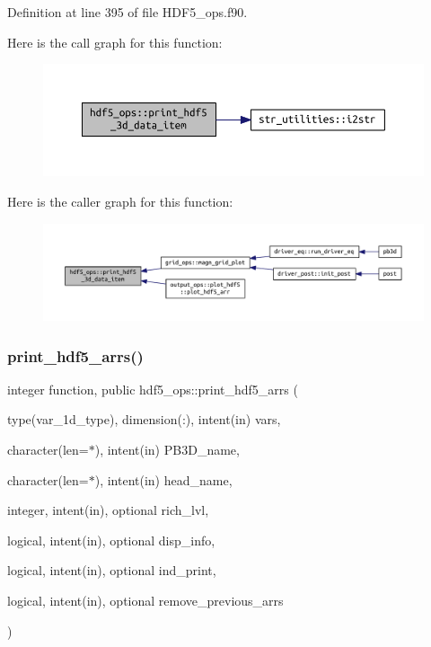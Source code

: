 Definition at line 395 of file H\+D\+F5\+\_\+ops.\+f90.

Here is the call graph for this function\+:\nopagebreak
\begin{figure}[H]
\begin{center}
\leavevmode
\includegraphics[width=350pt]{namespacehdf5__ops_ad794d069ca355f28536fba7e0d21bc13_cgraph}
\end{center}
\end{figure}
Here is the caller graph for this function\+:\nopagebreak
\begin{figure}[H]
\begin{center}
\leavevmode
\includegraphics[width=350pt]{namespacehdf5__ops_ad794d069ca355f28536fba7e0d21bc13_icgraph}
\end{center}
\end{figure}
\mbox{\label{namespacehdf5__ops_af80b879ed614698ed91b8235cf1cb22a}} 
\subsubsection{\texorpdfstring{print\+\_\+hdf5\+\_\+arrs()}{print\_hdf5\_arrs()}}
{\footnotesize\ttfamily integer function, public hdf5\+\_\+ops\+::print\+\_\+hdf5\+\_\+arrs (\begin{DoxyParamCaption}\item[{type(var\+\_\+1d\+\_\+type), dimension(\+:), intent(in)}]{vars,  }\item[{character(len=$\ast$), intent(in)}]{P\+B3\+D\+\_\+name,  }\item[{character(len=$\ast$), intent(in)}]{head\+\_\+name,  }\item[{integer, intent(in), optional}]{rich\+\_\+lvl,  }\item[{logical, intent(in), optional}]{disp\+\_\+info,  }\item[{logical, intent(in), optional}]{ind\+\_\+print,  }\item[{logical, intent(in), optional}]{remove\+\_\+previous\+\_\+arrs }\end{DoxyParamCaption})}



